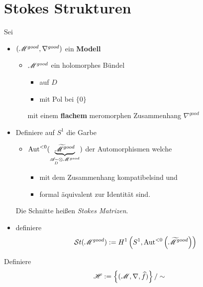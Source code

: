 \section{Stokes Strukturen} %
Sei
\begin{itemize}
  \item $(\mathscr{M}^{good},\nabla^{good})$ ein \textbf{Modell}
    \begin{itemize}
      \item $\mathscr{M}^{good}$ ein holomorphes Bündel
        \begin{itemize}
          \item auf $D$
          \item mit Pol bei $\{0\}$
        \end{itemize}
        mit einem \textbf{flachem} meromorphen Zusammenhang $\nabla^{good}$
    \end{itemize}
\end{itemize}
\begin{defn}
  \begin{itemize}
    \item Definiere auf $S^1$ die Garbe
      \begin{itemize}
        \item $\operatorname{Aut}^{<0}(
          \underset{\mathscr{A}_{\widetilde D}\otimes\mathscr{M}^{good}}
          {\underbrace{\widetilde{\mathscr{M}}^{good}}})$ der Automorphismen
          welche
          \begin{itemize}
            \item mit dem Zusammenhang kompatibel\TODO[in Formeln] sind und
            \item formal äquivalent zur Identität sind.
          \end{itemize}
      \end{itemize}
      Die Schnitte heißen \emph{Stokes Matrizen}.
    \item definiere
      \[
        \mathcal{S}{}t(\mathscr{M}^{good})
          :=H^1\left(S^1,\operatorname{Aut}^{<0}\left(\widetilde {\mathscr{M}}^{good}\right)\right)
      \]
  \end{itemize}
\end{defn}

\begin{comment}
  Definiere $\sH_X$ als die (Prä-)Garbe auf $X$ mit
  \[
    U\mapsto\sH_X(U)=\{(\sM,\nabla,\hat f) \mid \text{definiert auf $U$}\}
    /\sim
  \]
\end{comment}
Definiere 
\[
  \mathscr{H}:=\left\{(\mathscr{M},\nabla,\widehat f)\right\}/\sim
\]

